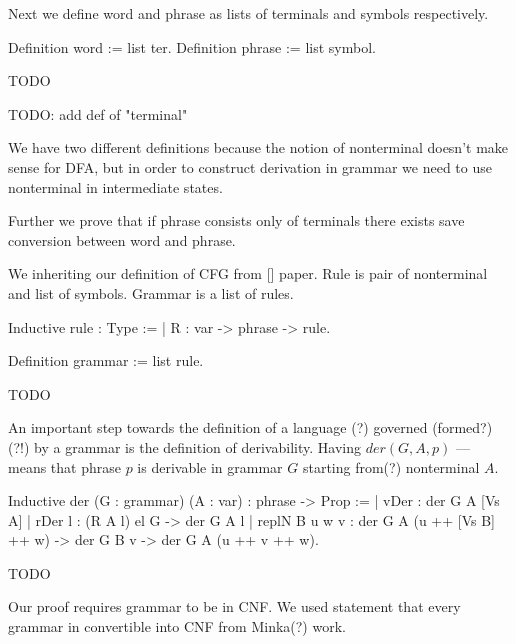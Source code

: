 Next we define word and phrase as lists of terminals and symbols respectively. 

\begin{listing}[h]
	\begin{pyglist}[language=coq, numbers=none, numbersep=5pt]
		Definition word := list ter.
		Definition phrase := list symbol.
	\end{pyglist}
	\caption{TODO}
	\label{lst:verbments1}
\end{listing}

TODO: add def of "terminal"

We have two different definitions because the notion of nonterminal doesn't make sense for DFA, but in order to construct derivation in grammar we need to use nonterminal in intermediate states. 

Further we prove that if phrase consists only of terminals there exists save conversion between word and phrase.

We inheriting our definition of CFG from [] paper. Rule is pair of nonterminal and list of symbols. Grammar is a list of rules. 

\begin{listing}[h]
	\begin{pyglist}[language=coq, numbers=none, numbersep=5pt]
		Inductive rule : Type :=
		| R : var -> phrase -> rule.
		
		Definition grammar := list rule.
	\end{pyglist}
	\caption{TODO}
	\label{lst:verbments1}
\end{listing}

An important step towards the definition of a language (?) governed (formed?)(?!) by a grammar is the definition of derivability. Having $der(G, A, p)$ --- means that phrase $p$ is derivable in grammar $G$ starting from(?) nonterminal $A$.

\begin{listing}[h]
	\begin{pyglist}[language=coq, numbers=none, numbersep=5pt]
		Inductive der (G : grammar) (A : var) : phrase -> Prop :=
		| vDer : der G A [Vs A]
		| rDer l : (R A l) el G -> der G A l
		| replN B u w v : 
		der G A (u ++ [Vs B] ++ w) -> der G B v -> der G A (u ++ v ++ w).
	\end{pyglist}
	\caption{TODO}
	\label{lst:verbments1}
\end{listing}

Our proof requires grammar to be in CNF. We used statement that every grammar in convertible into CNF from Minka(?) work.

